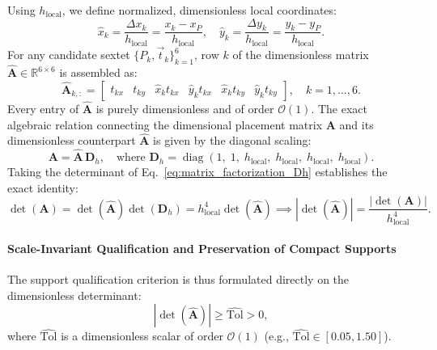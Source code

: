 \documentclass[preprint,12pt]{elsarticle}
\begin{document}
Using $h_{\mathrm{local}}$, we define normalized, dimensionless local coordinates:
\begin{equation}
    \hat{x}_k = \frac{\Delta x_k}{h_{\mathrm{local}}} = \frac{x_k - x_P}{h_{\mathrm{local}}}, \quad \hat{y}_k = \frac{\Delta y_k}{h_{\mathrm{local}}} = \frac{y_k - y_P}{h_{\mathrm{local}}}.
    \label{eq:normalized_local_coords}
\end{equation}
For any candidate sextet $\{P_k, \vec{t}_k\}_{k=1}^6$, row $k$ of the dimensionless matrix $\widehat{\mathbf{A}} \in \mathbb{R}^{6 \times 6}$ is assembled as:
\begin{equation}
    \widehat{\mathbf{A}}_{k, :} = \begin{bmatrix} t_{kx} & t_{ky} & \hat{x}_k t_{kx} & \hat{y}_k t_{kx} & \hat{x}_k t_{ky} & \hat{y}_k t_{ky} \end{bmatrix}, \quad k = 1, \dots, 6.
    \label{eq:matrix_A_hat_definition}
\end{equation}
Every entry of $\widehat{\mathbf{A}}$ is purely dimensionless and of order $\mathcal{O}(1)$. The exact algebraic relation connecting the dimensional placement matrix $\mathbf{A}$ and its dimensionless counterpart $\widehat{\mathbf{A}}$ is given by the diagonal scaling:
\begin{equation}
    \mathbf{A} = \widehat{\mathbf{A}} \, \mathbf{D}_h, \quad \text{where } \mathbf{D}_h = \operatorname{diag}(1, \; 1, \; h_{\mathrm{local}}, \; h_{\mathrm{local}}, \; h_{\mathrm{local}}, \; h_{\mathrm{local}}).
    \label{eq:matrix_factorization_Dh}
\end{equation}
Taking the determinant of Eq.~\eqref{eq:matrix_factorization_Dh} establishes the exact identity:
\begin{equation}
    \det(\mathbf{A}) = \det(\widehat{\mathbf{A}}) \det(\mathbf{D}_h) = h_{\mathrm{local}}^4 \det(\widehat{\mathbf{A}}) \implies |\det(\widehat{\mathbf{A}})| = \frac{|\det(\mathbf{A})|}{h_{\mathrm{local}}^4}.
    \label{eq:dimensionless_det_relation}
\end{equation}

\paragraph{Scale-Invariant Qualification and Preservation of Compact Supports}
The support qualification criterion is thus formulated directly on the dimensionless determinant:
\begin{equation}
    |\det(\widehat{\mathbf{A}})| \ge \widehat{\mathrm{Tol}} > 0,
    \label{eq:dimensionless_threshold_criterion}
\end{equation}
where $\widehat{\mathrm{Tol}}$ is a dimensionless scalar of order $\mathcal{O}(1)$ (e.g., $\widehat{\mathrm{Tol}} \in [0.05, 1.50]$).
\end{document}
